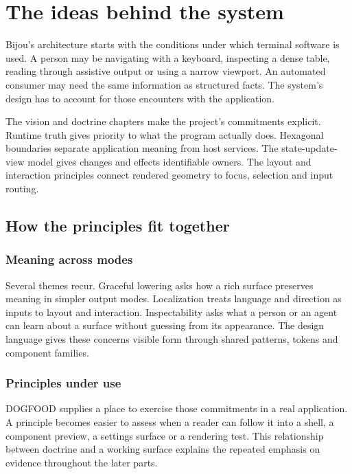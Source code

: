 \chapter*{The ideas behind the system}

Bijou's architecture starts with the conditions under which terminal software is used. A person may be navigating with a keyboard, inspecting a dense table, reading through assistive output or using a narrow viewport. An automated consumer may need the same information as structured facts. The system's design has to account for those encounters with the application.

The vision and doctrine chapters make the project's commitments explicit. Runtime truth gives priority to what the program actually does. Hexagonal boundaries separate application meaning from host services. The state-update-view model gives changes and effects identifiable owners. The layout and interaction principles connect rendered geometry to focus, selection and input routing.

\section*{How the principles fit together}

\subsection*{Meaning across modes}

Several themes recur. Graceful lowering asks how a rich surface preserves meaning in simpler output modes. Localization treats language and direction as inputs to layout and interaction. Inspectability asks what a person or an agent can learn about a surface without guessing from its appearance. The design language gives these concerns visible form through shared patterns, tokens and component families.

\subsection*{Principles under use}

DOGFOOD supplies a place to exercise those commitments in a real application. A principle becomes easier to assess when a reader can follow it into a shell, a component preview, a settings surface or a rendering test. This relationship between doctrine and a working surface explains the repeated emphasis on evidence throughout the later parts.


